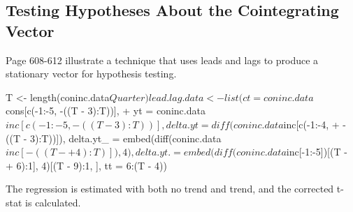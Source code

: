 \documentclass[a4paper]{article}
\renewcommand{\~}{\perispomeni}%
\begin{document}
\subsection{Testing Hypotheses About the Cointegrating Vector}
Page 608-612 illustrate a technique that uses leads and lags to produce a stationary
vector for hypothesis testing.
\begin{Schunk}
\begin{Sinput}
 T <- length(coninc.data$Quarter)
 lead.lag.data <- list(ct = coninc.data$cons[c(-1:-5, -((T - 3):T))], 
+     yt = coninc.data$inc[c(-1:-5, -((T - 3):T))], delta.yt = diff(coninc.data$inc[c(-1:-4, 
+         -((T - 3):T))]), delta.yt_ = embed(diff(coninc.data$inc[-((T - 
+         4):T)]), 4), delta.yt. = embed(diff(coninc.data$inc[-1:-5])[(T - 
+         6):1], 4)[(T - 9):1, ], tt = 6:(T - 4))
\end{Sinput}
\end{Schunk}
The regression is estimated with both no trend and trend, and the corrected t-stat is calculated.
\end{document}
